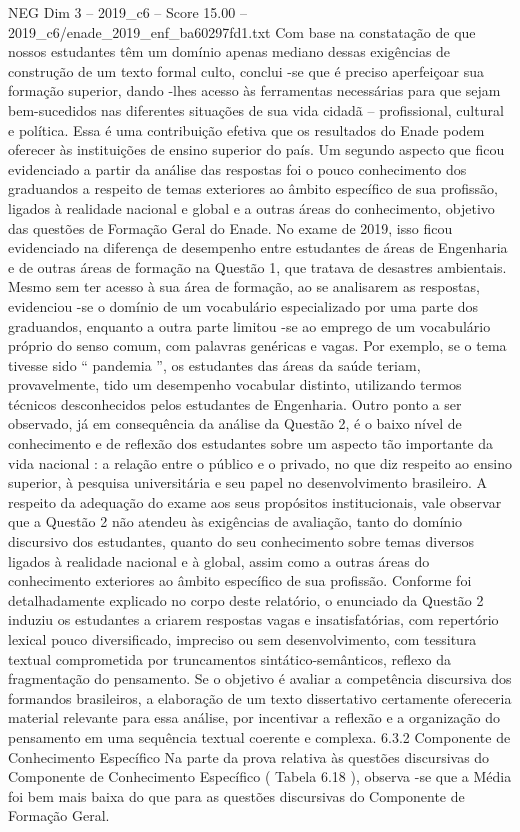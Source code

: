 \begin{textsample}{NEG Dim 3 – 2019\_c6 – Score 15.00 – 2019\_c6/enade\_2019\_enf\_ba60297fd1.txt}
Com base na constatação de que nossos estudantes têm um domínio apenas mediano dessas exigências de construção de um texto formal culto, conclui -se que é preciso aperfeiçoar sua formação superior, dando -lhes acesso às ferramentas necessárias para que sejam bem-sucedidos nas diferentes situações de sua vida cidadã – profissional, cultural e política.
Essa é uma contribuição efetiva que os resultados do Enade podem oferecer às instituições de ensino superior do país.
Um segundo aspecto que ficou evidenciado a partir da análise das respostas foi o pouco conhecimento dos graduandos a respeito de temas exteriores ao âmbito específico de sua profissão, ligados à realidade nacional e global e a outras áreas do conhecimento, objetivo das questões de Formação Geral do Enade.
No exame de 2019, isso ficou evidenciado na diferença de desempenho entre estudantes de áreas de Engenharia e de outras áreas de formação na Questão 1, que tratava de desastres ambientais.
Mesmo sem ter acesso à sua área de formação, ao se analisarem as respostas, evidenciou -se o domínio de um vocabulário especializado por uma parte dos graduandos, enquanto a outra parte limitou -se ao emprego de um vocabulário próprio do senso comum, com palavras genéricas e vagas.
Por exemplo, se o tema tivesse sido “ pandemia ”, os estudantes das áreas da saúde teriam, provavelmente, tido um desempenho vocabular distinto, utilizando termos técnicos desconhecidos pelos estudantes de Engenharia.
Outro ponto a ser observado, já em consequência da análise da Questão 2, é o baixo nível de conhecimento e de reflexão dos estudantes sobre um aspecto tão importante da vida nacional : a relação entre o público e o privado, no que diz respeito ao ensino superior, à pesquisa universitária e seu papel no desenvolvimento brasileiro.
A respeito da adequação do exame aos seus propósitos institucionais, vale observar que a Questão 2 não atendeu às exigências de avaliação, tanto do domínio discursivo dos estudantes, quanto do seu conhecimento sobre temas diversos ligados à realidade nacional e à global, assim como a outras áreas do conhecimento exteriores ao âmbito específico de sua profissão.
Conforme foi detalhadamente explicado no corpo deste relatório, o enunciado da Questão 2 induziu os estudantes a criarem respostas vagas e insatisfatórias, com repertório lexical pouco diversificado, impreciso ou sem desenvolvimento, com tessitura textual comprometida por truncamentos sintático-semânticos, reflexo da fragmentação do pensamento.
Se o objetivo é avaliar a competência discursiva dos formandos brasileiros, a elaboração de um texto dissertativo certamente ofereceria material relevante para essa análise, por incentivar a reflexão e a organização do pensamento em uma sequência textual coerente e complexa. 6.3.2 Componente de Conhecimento Específico Na parte da prova relativa às questões discursivas do Componente de Conhecimento Específico ( Tabela 6.18 ), observa -se que a Média foi bem mais baixa do que para as questões discursivas do Componente de Formação Geral.

\end{textsample}
